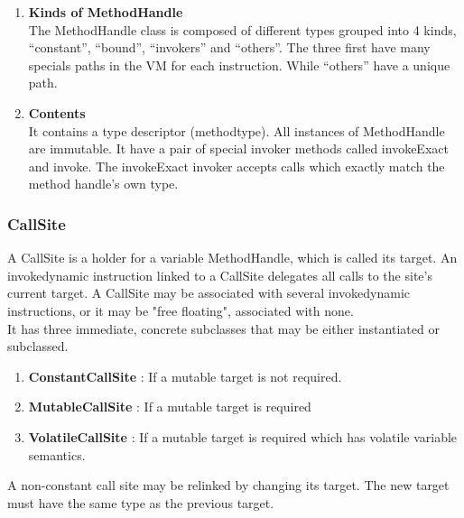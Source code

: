 \documentclass{sigplanconf}
\def \VM{VM\xspace}
\begin{document}
        \begin{enumerate}
          \item \textbf{Kinds of MethodHandle}\\
            The MethodHandle class is composed of different types grouped into 4 kinds,
            ``constant'', ``bound'', ``invokers'' and ``others''.
            The three first have many specials paths in the \VM for each instruction.
            While ``others'' have a unique path.
          \item \textbf{Contents}\\
            It contains a type descriptor (methodtype).
            All instances of MethodHandle are immutable.
            It have a pair of special invoker methods called invokeExact and invoke.
            The invokeExact invoker accepts calls which exactly match the method handle's own type.
        \end{enumerate}

      \subsubsection{CallSite}
        A CallSite is a holder for a variable MethodHandle, which is called its target.
        An invokedynamic instruction linked to a CallSite delegates all calls to the site's current target.
        A CallSite may be associated with several invokedynamic instructions,
        or it may be "free floating", associated with none.\\

        It has three immediate, concrete subclasses that may be either instantiated or subclassed.
        \begin{enumerate}
          \item \textbf{ConstantCallSite} : If a mutable target is not required.
          \item \textbf{MutableCallSite}  : If a mutable target is required
          \item \textbf{VolatileCallSite} : If a mutable target is required which has volatile variable semantics.
        \end{enumerate}
        A non-constant call site may be relinked by changing its target.
        The new target must have the same type as the previous target.
\end{document}
